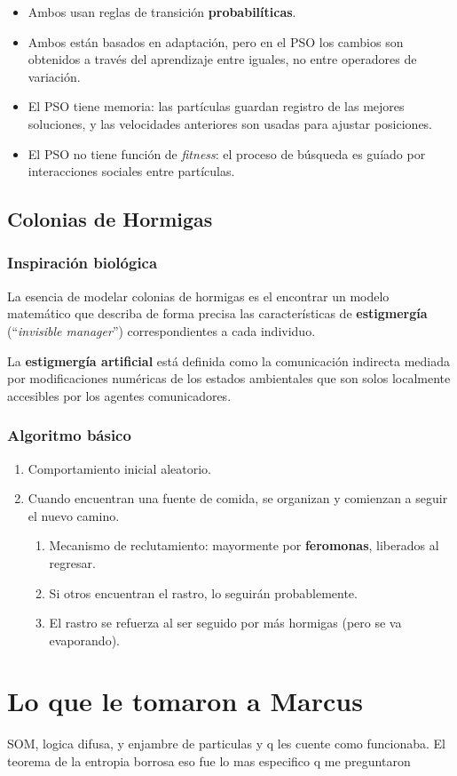 \documentclass[10pt,a4paper]{article}
\begin{document}
\begin{itemize}
\item Ambos usan reglas de transición \textbf{probabilíticas}.
\item Ambos están  basados en adaptación, pero en el PSO los cambios son obtenidos a través del aprendizaje entre iguales, no entre operadores de variación.
\item El PSO tiene memoria: las partículas guardan registro de las mejores soluciones, y las velocidades anteriores son usadas para ajustar posiciones.
\item El PSO no tiene función de \textit{fitness}: el proceso de búsqueda es guíado por interacciones sociales entre partículas.
\end{itemize}

\subsection{Colonias de Hormigas}

\subsubsection{Inspiración biológica}

La esencia de modelar colonias de hormigas es el encontrar un modelo matemático que describa de forma precisa las características de \textbf{estigmergía} (``\textit{invisible manager}'') correspondientes a cada individuo.

La \textbf{estigmergía artificial} está definida como la comunicación indirecta mediada por modificaciones numéricas de los estados ambientales que son solos localmente accesibles por los agentes comunicadores.

\subsubsection{Algoritmo básico}

\begin{enumerate}
\item Comportamiento inicial aleatorio.
\item Cuando encuentran una fuente de comida, se organizan y comienzan a seguir el nuevo camino.
\begin{enumerate}[2.1]
\item Mecanismo de reclutamiento: mayormente por \textbf{feromonas}, liberados al regresar.
\item Si otros encuentran el rastro, lo seguirán probablemente.
\item El rastro se refuerza al ser seguido por más hormigas (pero se va evaporando).
\end{enumerate}
\end{enumerate}

\section{Lo que le tomaron a Marcus}
SOM, logica difusa, y enjambre de particulas y q les cuente como funcionaba. El teorema de la entropia borrosa eso fue lo mas especifico q me preguntaron
\end{document}
